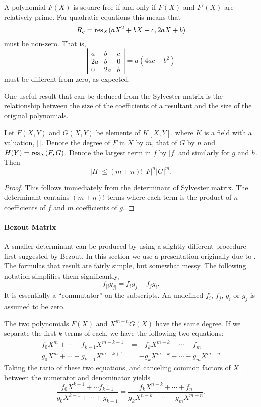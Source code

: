 A polynomial $F(X)$ is square free if and only if $F(X)$ and $F'(X)$
are relatively prime.  For quadratic equations this means that 
\[
R_q = \mathop{\rm res}\nolimits_X(aX^2+bX+c, 2aX+b)
\]
must be non-zero.  That is,
\[
\left|\begin{array}{ccc}
a & b & c \\ 2a & b & 0 \\ 0 & 2a & b 
\end{array}
\right| = a(4ac - b^2)
\]
must be different from zero, as expected.

\medskip
One useful result that can be deduced from the Sylvester matrix is the
relationship between the size of the coefficients of a resultant and
the size of the original polynomials.

\begin{proposition} \label{Resultant:Bound:Prop}
Let $F(X, Y)$ and $G(X, Y)$ be elements of $K[X, Y]$, where $K$ is a
field with a valuation, $|\,|$.  Denote the degree of $F$ in $X$ by
$m$, that of $G$ by $n$ and $H(Y) = \mathop{\rm res}\nolimits_X(F, G)$.  Denote the largest
term in $f$ by $|f|$ and similarly for $g$ and $h$.  Then
\[
|H| \le (m+n)!\, |F|^n |G|^m.
\]
\end{proposition}

\begin{proof}
This follows immediately from the determinant of Sylvester
matrix. The determinant contains $(m+n)!$ terms where each term is
the product of $n$ coefficients of $f$ and $m$ coefficients of $g$.
\end{proof}
\paragraph{Bezout Matrix}

 A smaller determinant can be produced by using a
slightly different procedure first suggested by Bezout.  In this
section we use a presentation originally due to {\Cauchy}.  The
formulas that result are fairly simple, but somewhat messy.  The
following notation simplifies them significantly,
\[
f_{[i}g_{j]} = f_i g_j - f_j g_i.
\]
It is essentially a ``commutator'' on the subscripts.  An undefined $f_i$,
$f_j$, $g_i$ or $g_j$ is assumed to be zero.

The two polynomials $F(X)$ and $X^{m-n}G(X)$ have the same degree.  If we
separate the first $k$ terms of each, we have the following two equations:
\[
\begin{aligned}
f_0 X^m + \cdots + f_{k-1} X^{m-k+1} & = - f_k X^{m- k} - \cdots - f_m\\
g_0 X^m + \cdots + g_{k-1} X^{m-k+1} & = - g_k X^{m - k} - \cdots - g_m
X^{m-n}
\end{aligned}
\]
Taking the ratio of these two equations, and canceling common factors of
$X$ between the numerator and denominator yields
\[
\frac{f_0 X^{k-1} + \cdots f_{k-1}}{g_0 X^{k-1} + \cdots + g_{k-1}} =
\frac{f_k X^{n - k} + \cdots + f_n}{g_k X^{n-k} + \cdots + g_m X^{m-n}}.
\]

